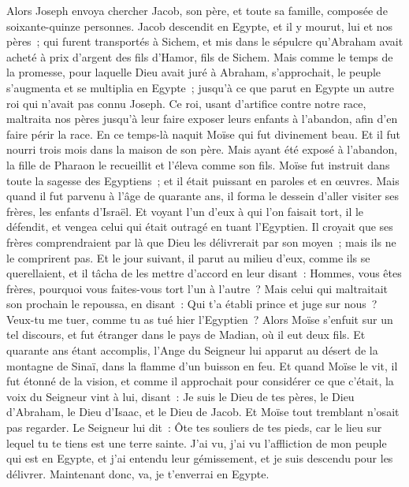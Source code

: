\begin{multicols}{2}
Alors Joseph envoya chercher Jacob, son père, et toute sa famille, composée de soixante-quinze personnes.
Jacob descendit en Egypte, et il y mourut, lui et nos pères~;
qui furent transportés à Sichem, et mis dans le sépulcre qu'Abraham avait acheté à prix d'argent des fils d'Hamor, fils de Sichem.
Mais comme le temps de la promesse, pour laquelle Dieu avait juré à Abraham, s'approchait, le peuple s'augmenta et se multiplia en Egypte~;
jusqu'à ce que parut en Egypte un autre roi qui n'avait pas connu Joseph.
Ce roi, usant d'artifice contre notre race, maltraita nos pères jusqu'à leur faire exposer leurs enfants à l'abandon, afin d'en faire périr la race.
En ce temps-là naquit Moïse qui fut divinement beau. Et il fut nourri trois mois dans la maison de son père.
Mais ayant été exposé à l'abandon, la fille de Pharaon le recueillit et l'éleva comme son fils.
Moïse fut instruit dans toute la sagesse des Egyptiens~; et il était puissant en paroles et en œuvres.
Mais quand il fut parvenu à l'âge de quarante ans, il forma le dessein d'aller visiter ses frères, les enfants d'Israël.
Et voyant l'un d'eux à qui l'on faisait tort, il le défendit, et vengea celui qui était outragé en tuant l'Egyptien.
Il croyait que ses frères comprendraient par là que Dieu les délivrerait par son moyen~; mais ils ne le comprirent pas.
Et le jour suivant, il parut au milieu d'eux, comme ils se querellaient, et il tâcha de les mettre d'accord en leur disant~: Hommes, vous êtes frères, pourquoi vous faites-vous tort l'un à l'autre~?
Mais celui qui maltraitait son prochain le repoussa, en disant~: Qui t'a établi prince et juge sur nous~?
Veux-tu me tuer, comme tu as tué hier l'Egyptien~?
Alors Moïse s'enfuit sur un tel discours, et fut étranger dans le pays de Madian, où il eut deux fils.
Et quarante ans étant accomplis, l'Ange du Seigneur lui apparut au désert de la montagne de Sinaï, dans la flamme d'un buisson en feu.
Et quand Moïse le vit, il fut étonné de la vision, et comme il approchait pour considérer ce que c'était, la voix du Seigneur vint à lui, disant~:
Je suis le Dieu de tes pères, le Dieu d'Abraham, le Dieu d'Isaac, et le Dieu de Jacob. Et Moïse tout tremblant n'osait pas regarder.
Le Seigneur lui dit~: Ôte tes souliers de tes pieds, car le lieu sur lequel tu te tiens est une terre sainte.
J'ai vu, j'ai vu l'affliction de mon peuple qui est en Egypte, et j'ai entendu leur gémissement, et je suis descendu pour les délivrer. Maintenant donc, va, je t'enverrai en Egypte.

\end{multicols}
